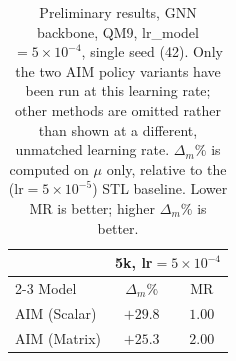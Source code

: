 %

\begin{table}[t]
\centering
\caption{Preliminary results, GNN backbone, QM9, lr\_model$=5\times10^{-4}$,
single seed (42). Only the two AIM policy variants have been run at this
learning rate; other methods are omitted rather than shown at a different,
unmatched learning rate. $\Delta_m\%$ is computed on $\mu$ only, relative to
the (lr$=5\times10^{-5}$) STL baseline. Lower MR is better; higher $\Delta_m\%$
is better.}
\label{tab:gnn_5k_lr5e4_paperstyle}
\begin{tabular}{lcc}
\toprule
 & \multicolumn{2}{c}{5k, lr$=5\times10^{-4}$} \\
\cmidrule(lr){2-3}
Model & $\Delta_m\%$ & MR \\
\midrule
AIM (Scalar) & $\mathbf{+29.8}$ & $\mathbf{1.00}$ \\
AIM (Matrix) & $+25.3$          & $2.00$ \\
\bottomrule
\end{tabular}
\end{table}
